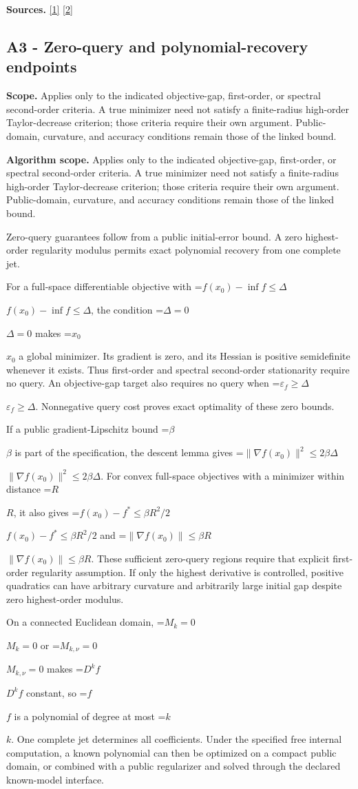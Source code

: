 \documentclass[10pt,a4paper]{article}
\newcommand{\AtlasMath}[1]{\par\begingroup\centering\setbox0=\hbox{$\displaystyle #1$}\ifdim\wd0>1.4\linewidth\typeout{ATLAS WIDE FORMULA: \the\wd0}\fi\ifdim\wd0>\linewidth\resizebox{\linewidth}{!}{\box0}\else\box0\fi\par\endgroup}
\newcommand{\AtlasInlineMath}[1]{\begingroup\setbox0=\hbox{$#1$}\ifdim\wd0>.4\linewidth\endgroup\AtlasMath{#1}\else\endgroup$#1$\fi}
\begin{document}
\textbf{Sources.} \href{https://arxiv.org/pdf/2411.08987v2}{[1]} \href{https://arxiv.org/pdf/2205.09647v1}{[2]}

\subsection{A3 - Zero-query and polynomial-recovery endpoints}
\textbf{Scope.} Applies only to the indicated objective-gap, first-order, or spectral second-order criteria. A true minimizer need not satisfy a finite-radius high-order Taylor-decrease criterion; those criteria require their own argument. Public-domain, curvature, and accuracy conditions remain those of the linked bound.

\textbf{Algorithm scope.} Applies only to the indicated objective-gap, first-order, or spectral second-order criteria. A true minimizer need not satisfy a finite-radius high-order Taylor-decrease criterion; those criteria require their own argument. Public-domain, curvature, and accuracy conditions remain those of the linked bound.

Zero-query guarantees follow from a public initial-error bound. A zero highest-order regularity modulus permits exact polynomial recovery from one complete jet.

For a full-space differentiable objective with \AtlasInlineMath{f(x_0)-\inf f\le\Delta}, the condition \AtlasInlineMath{\Delta=0} makes \AtlasInlineMath{x_0} a global minimizer. Its gradient is zero, and its Hessian is positive semidefinite whenever it exists. Thus first-order and spectral second-order stationarity require no query. An objective-gap target also requires no query when \AtlasInlineMath{\varepsilon_f\ge\Delta}. Nonnegative query cost proves exact optimality of these zero bounds.

If a public gradient-Lipschitz bound \AtlasInlineMath{\beta} is part of the specification, the descent lemma gives \AtlasInlineMath{\|\nabla f(x_0)\|^2\le2\beta\Delta}. For convex full-space objectives with a minimizer within distance \AtlasInlineMath{R}, it also gives \AtlasInlineMath{f(x_0)-f^*\le\beta R^2/2} and \AtlasInlineMath{\|\nabla f(x_0)\|\le\beta R}. These sufficient zero-query regions require that explicit first-order regularity assumption. If only the highest derivative is controlled, positive quadratics can have arbitrary curvature and arbitrarily large initial gap despite zero highest-order modulus.

On a connected Euclidean domain, \AtlasInlineMath{M_k=0} or \AtlasInlineMath{M_{k,\nu}=0} makes \AtlasInlineMath{D^kf} constant, so \AtlasInlineMath{f} is a polynomial of degree at most \AtlasInlineMath{k}. One complete jet determines all coefficients. Under the specified free internal computation, a known polynomial can then be optimized on a compact public domain, or combined with a public regularizer and solved through the declared known-model interface.
\end{document}
